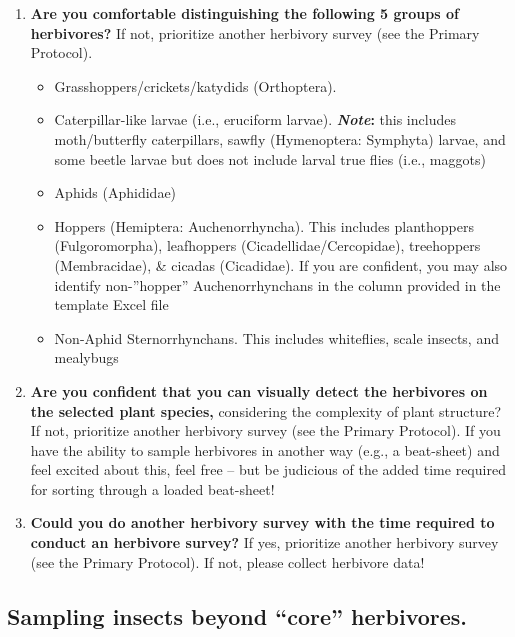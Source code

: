 \documentclass[
  letterpaper,
  oneside,
  open=any]{scrbook}
\begin{document}
\begin{enumerate}
\def\labelenumi{\arabic{enumi}.}
\item
  \textbf{Are you comfortable distinguishing the following 5 groups of
  herbivores? }If not, prioritize another herbivory survey (see the
  Primary Protocol).

  \begin{itemize}
  \item
    Grasshoppers/crickets/katydids (Orthoptera).
  \item
    Caterpillar-like larvae (i.e., eruciform larvae).
    \textbf{\emph{Note}: }this includes moth/butterfly caterpillars,
    sawfly (Hymenoptera: Symphyta) larvae, and some beetle larvae but
    does not include larval true flies (i.e., maggots)
  \item
    Aphids (Aphididae)
  \item
    Hoppers (Hemiptera: Auchenorrhyncha). This includes planthoppers
    (Fulgoromorpha), leafhoppers (Cicadellidae/Cercopidae), treehoppers
    (Membracidae), \& cicadas (Cicadidae). If you are confident, you may
    also identify non-''hopper'' Auchenorrhynchans in the column
    provided in the template Excel file
  \item
    Non-Aphid Sternorrhynchans. This includes whiteflies, scale insects,
    and mealybugs
  \end{itemize}
\item
  \textbf{Are you confident that you can visually detect the herbivores
  on the selected plant species,} considering the complexity of plant
  structure? If not, prioritize another herbivory survey (see the
  Primary Protocol). If you have the ability to sample herbivores in
  another way (e.g., a beat-sheet) and feel excited about this, feel
  free -- but be judicious of the added time required for sorting
  through a loaded beat-sheet!
\item
  \textbf{Could you do another herbivory survey with the time required
  to conduct an herbivore survey?} If yes, prioritize another herbivory
  survey (see the Primary Protocol). If not, please collect herbivore
  data!
\end{enumerate}

\subsection{Sampling insects beyond ``core''
herbivores.}\label{sampling-insects-beyond-core-herbivores.}
\end{document}
